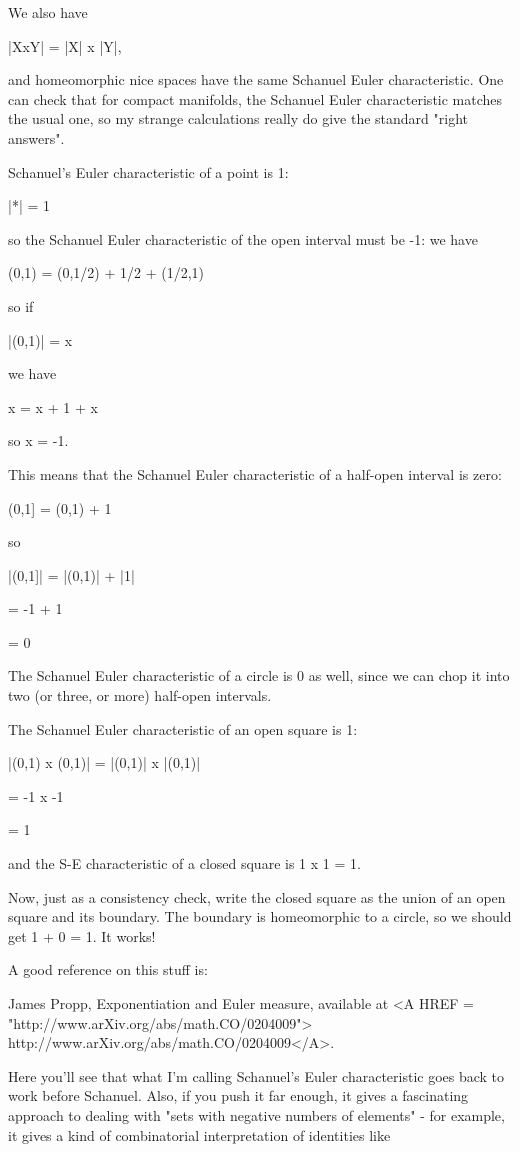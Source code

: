 We also have

|XxY| = |X| x |Y|, 

and homeomorphic nice spaces have the same Schanuel Euler characteristic.
One can check that for compact manifolds, the Schanuel Euler characteristic
matches the usual one, so my strange calculations really do give the
standard "right answers".

Schanuel's Euler characteristic of a point is 1:

|*| = 1

so the Schanuel Euler characteristic of the open interval
must be -1: we have

(0,1) = (0,1/2) + {1/2} + (1/2,1)

so if 

|(0,1)| = x

we have

x = x + 1 + x

so x = -1.

This means that the Schanuel Euler characteristic of a half-open
interval is zero:

(0,1] = (0,1) + {1}

so 

|(0,1]| = |(0,1)| + |{1}|

        =    -1   +   1

        =     0
           
The Schanuel Euler characteristic of a circle is 0 as well,
since we can chop it into two (or three, or more) half-open intervals.

The Schanuel Euler characteristic of an open square is 1:

|(0,1) x (0,1)| = |(0,1)| x |(0,1)| 

                =   -1    x    -1

                =    1

and the S-E characteristic of a closed square is 1 x 1 = 1.

Now, just as a consistency check, write the closed square as 
the union of an open square and its boundary.  The boundary
is homeomorphic to a circle, so we should get 1 + 0 = 1.  It works!

A good reference on this stuff is:

James Propp, Exponentiation and Euler measure,
available at <A HREF = "http://www.arXiv.org/abs/math.CO/0204009">
http://www.arXiv.org/abs/math.CO/0204009</A>.

Here you'll see that what I'm calling Schanuel's Euler
characteristic goes back to work before Schanuel.  Also,
if you push it far enough, it gives a fascinating approach 
to dealing with "sets with negative numbers of elements" - 
for example, it gives a kind of combinatorial interpretation
of identities like

